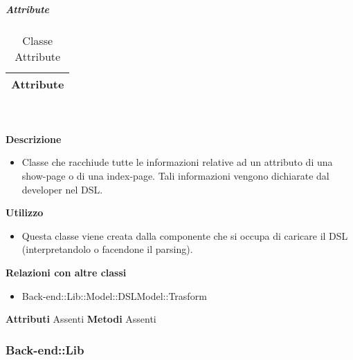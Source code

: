 			\subparagraph{Attribute} 
\begin{table}[ht]
\begin{center}
\bgroup
	\setlength{\arrayrulewidth}{0.6mm}
	\def\arraystretch{1}
		\begin{tabular}{ | p{12cm} | }
				\hline  
					\centerline{\textbf{Attribute}}
		\\ \hline 
				\hline
				\hline
		
		\end{tabular}
\egroup
\caption{Classe Attribute}
\end{center}
\end{table} \textbf{\\ \\ Descrizione}
\begin{itemize}
\item[] Classe che racchiude tutte le informazioni relative ad un attributo di una show-page o di una index-page. Tali informazioni vengono dichiarate dal developer nel DSL.
\end{itemize} 
\textbf{Utilizzo}
\begin{itemize}
\item[] Questa classe viene creata dalla componente che si occupa di caricare il DSL (interpretandolo o facendone il parsing).
\end{itemize}
\textbf{Relazioni con altre classi}
\begin{itemize}
\item{Back-end::Lib::Model::DSLModel::Trasform}
\end{itemize}
\textbf{Attributi}
Assenti
\textbf{Metodi}
Assenti

	\subsubsection{Back-end::Lib} 
